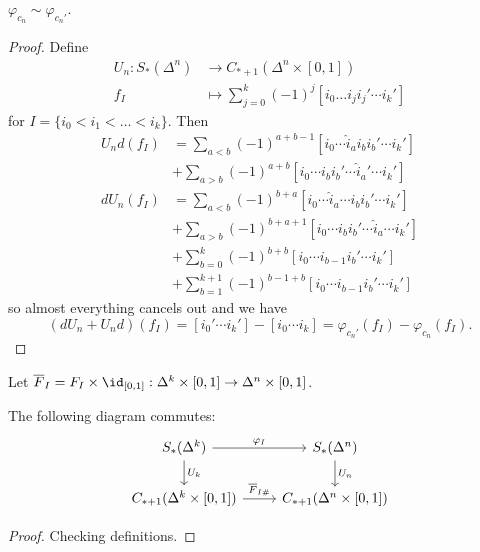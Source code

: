 \documentclass[a4paper]{article}
\begin{document}
\begin{proposition}
  \(\varphi_{c_n} \sim \varphi_{c_n'}\).
\end{proposition}

\begin{proof}
  Define
  \begin{align*}
    U_n: S_*(\Delta^n) &\to C_{* + 1}(\Delta^n \times [0, 1]) \\
    f_I &\mapsto \sum_{j = 0}^k (-1)^j [i_0 \dots i_j i_j' \cdots i_k']
  \end{align*}
  for \(I = \{i_0 < i_1 < \dots < i_k\}\). Then
  \begin{align*}
    U_n d(f_I) &= \sum_{a < b} (-1)^{a + b - 1} [i_0 \cdots \hat i_a i_b i_b' \cdots i_k'] \\
               &+ \sum_{a > b} (-1)^{a + b} [i_0 \cdots i_b i_b' \cdots \hat i_a' \cdots i_k'] \\
    dU_n(f_I) &= \sum_{a < b} (-1)^{b + a} [i_0 \cdots \hat i_a \cdots i_b i_b' \cdots i_k'] \\
               &+ \sum_{a > b} (-1)^{b + a + 1} [i_0 \cdots i_b i_b' \cdots \hat i_a \cdots i_k'] \\
               &+ \sum_{b = 0}^k (-1)^{b + b} [i_0 \cdots i_{b - 1} i_b' \cdots i_k'] \\
               &+ \sum_{b = 1}^{k + 1} (-1)^{b - 1 + b} [i_0 \cdots i_{b - 1} i_b' \cdots i_k']
  \end{align*}
  so almost everything cancels out and we have
  \[
    (dU_n + U_nd) (f_I) = [i_0' \cdots i_k'] - [i_0 \cdots i_k] = \varphi_{c_n'} (f_I) - \varphi_{c_n}(f_I).
  \]
\end{proof}

\begin{notation}
  Let \(\overline F_I = F_I \times \id_{[0, 1]}: \Delta^k \times [0, 1] \to \Delta^n \times [0, 1]\).
\end{notation}

\begin{lemma}
  The following diagram commutes:
  \[
    \begin{tikzcd}
      S_*(\Delta^k) \ar[r, "\varphi_I"] \ar[d, "U_k"] & S_*(\Delta^n) \ar[d, "U_n"] \\
      C_{* + 1}(\Delta^k \times [0, 1]) \ar[r, "\overline F_{I \#}"] & C_{* + 1} (\Delta^n \times [0, 1])
    \end{tikzcd}
  \]
\end{lemma}

\begin{proof}
  Checking definitions.
\end{proof}
\end{document}
